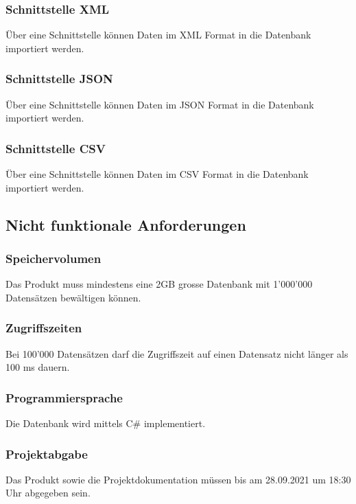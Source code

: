 \documentclass{article}
\begin{document}
\subsubsection{Schnittstelle XML}
Über eine Schnittstelle können Daten im XML Format in die Datenbank importiert werden.
\subsubsection{Schnittstelle JSON}
Über eine Schnittstelle können Daten im JSON Format in die Datenbank importiert werden.
\subsubsection{Schnittstelle CSV}
Über eine Schnittstelle können Daten im CSV Format in die Datenbank importiert werden.
\subsubsection{}
\subsection{Nicht funktionale Anforderungen}
\subsubsection{Speichervolumen}
Das Produkt muss mindestens eine 2GB grosse Datenbank mit 1'000'000 Datensätzen bewältigen können.
\subsubsection{Zugriffszeiten}
Bei 100'000 Datensätzen darf die Zugriffszeit auf einen Datensatz nicht länger als 100 ms dauern.
\subsubsection{Programmiersprache}
Die Datenbank wird mittels C\# implementiert.
\subsubsection{Projektabgabe}
Das Produkt sowie die Projektdokumentation müssen bis am 28.09.2021 um 18:30 Uhr abgegeben sein.
\end{document}
